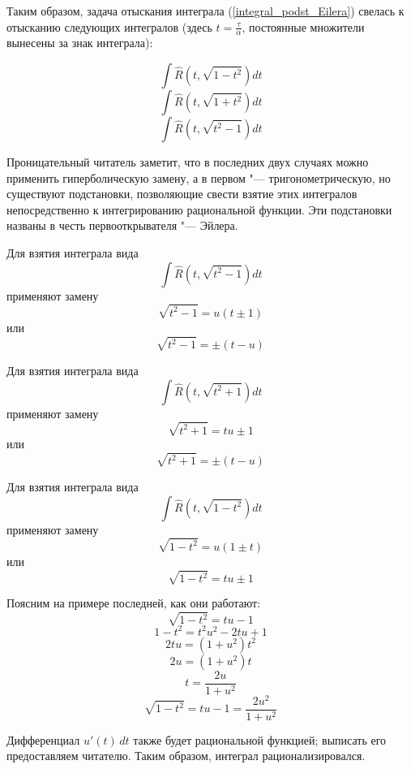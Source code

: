 Таким образом, задача отыскания интеграла (\ref{integral_podst_Eilera}) свелась к отысканию следующих интегралов (здесь $t=\frac{\tau}{\alpha}$, постоянные множители вынесены за знак интеграла):

$$
\int\hat R(t,\sqrt{1-t^2})dt
$$$$
\int\hat R(t,\sqrt{1+t^2})dt
$$$$
\int\hat R(t,\sqrt{t^2-1})dt
$$

Проницательный читатель заметит, что в последних двух случаях можно применить гиперболическую замену,
а в первом "--- тригонометрическую, но существуют подстановки, позволяющие свести взятие этих интегралов непосредственно к интегрированию рациональной функции. Эти подстановки названы в честь первооткрывателя "--- Эйлера.

Для взятия интеграла вида
$$\int\hat R(t,\sqrt{t^2-1})dt$$
применяют замену
$$\sqrt{t^2-1}=u(t\pm 1)$$
или
$$\sqrt{t^2-1}=\pm(t-u)$$

Для взятия интеграла вида
$$\int\hat R(t,\sqrt{t^2+1})dt$$
применяют замену
$$\sqrt{t^2+1}=tu\pm 1$$
или
$$\sqrt{t^2+1}=\pm(t-u)$$

Для взятия интеграла вида
$$\int\hat R(t,\sqrt{1-t^2})dt$$
применяют замену
$$\sqrt{1-t^2}=u(1\pm t)$$
или
$$\sqrt{1-t^2}=tu\pm1$$

Поясним на примере последней, как они работают:
$$\sqrt{1-t^2}=tu-1$$
$$1-t^2=t^2 u^2 -2tu+1$$
$$2tu=(1+u^2)t^2$$
$$2u=(1+u^2)t$$
$$t=\frac{2u}{1+u^2}$$
$$\sqrt{1-t^2}=tu-1=\frac{2u^2}{1+u^2}$$

Дифференциал $u'(t)\,dt$ также будет рациональной функцией; выписать его предоставляем читателю. Таким образом, интеграл рационализировался.
